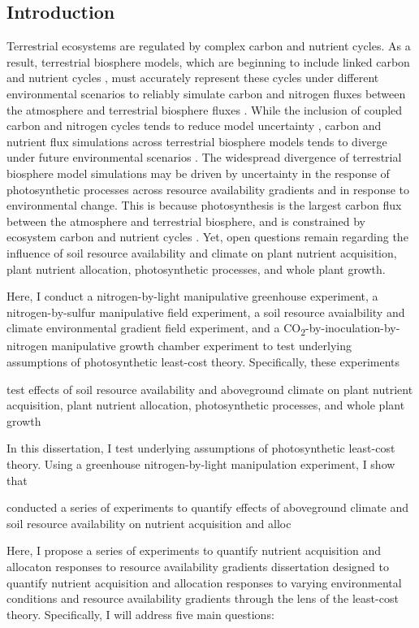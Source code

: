 \begin{singlespace}
    \chapter{\textbf{Introduction}}
\end{singlespace}


Terrestrial ecosystems are regulated by complex carbon and nutrient cycles. As a result, terrestrial biosphere models, which are beginning to include linked carbon and nutrient cycles , must accurately represent these cycles under different environmental scenarios to reliably simulate carbon and nitrogen fluxes between the atmosphere and terrestrial biosphere fluxes . While the inclusion of coupled carbon and nitrogen cycles tends to reduce model uncertainty , carbon and nutrient flux simulations across terrestrial biosphere models tends to diverge under future environmental scenarios . The widespread divergence of terrestrial biosphere model simulations may be driven by uncertainty in the response of photosynthetic processes across resource availability gradients and in response to environmental change. This is because photosynthesis is the largest carbon flux between the atmosphere and terrestrial biosphere, and is constrained by ecosystem carbon and nutrient cycles . Yet, open questions remain regarding the influence of soil resource availability and climate on plant nutrient acquisition, plant nutrient allocation, photosynthetic processes, and whole plant growth.



Here, I conduct a nitrogen-by-light manipulative greenhouse experiment, a nitrogen-by-sulfur manipulative field experiment, a soil resource avaialbility and climate environmental gradient field experiment, and a CO\textsubscript{2}-by-inoculation-by-nitrogen manipulative growth chamber experiment to test underlying assumptions of photosynthetic least-cost theory. Specifically, these experiments 


test effects of soil resource availability and aboveground climate on plant nutrient acquisition, plant nutrient allocation, photosynthetic processes, and whole plant growth

In this dissertation, I test underlying assumptions of photosynthetic least-cost theory. Using a greenhouse nitrogen-by-light manipulation experiment, I show that 


conducted a series of experiments to quantify effects of aboveground climate and soil resource availability on nutrient acquisition and alloc

Here, I propose a series of experiments to quantify nutrient acquisition and allocaton responses to resource availability gradients 
dissertation designed to quantify nutrient acquisition and allocation responses to varying environmental conditions and resource availability gradients through the lens of the least-cost theory. Specifically, I will address five main questions:



